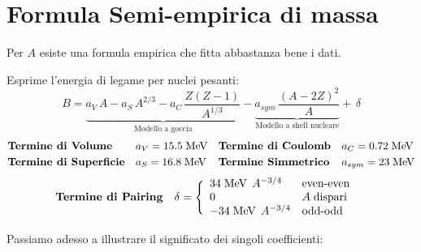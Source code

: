 \section{Formula Semi-empirica di massa}
Per $A$  esiste una formula empirica che fitta abbastanza bene i dati.
\begin{definition}
Esprime l'energia di legame per nuclei pesanti:
$$B = \underbrace{a_V \, A - a_S\, A^{2/3} - a_C \, \frac{Z(Z-1)}{A^{1/3}}}_\text{Modello a goccia} %
- \underbrace{a_{sym} \, \frac{(A-2Z)^2}{A}}_\text{Modello a shell nucleare} %
+\, \delta$$
\begin{displaymath}
\begin{aligned}
&\text{\textbf{Termine di Volume}} & &a_V = 15.5\;\mbox{MeV} & &\text{\textbf{Termine di Coulomb}} & &a_C = 0.72\;\mbox{MeV}\\
&\text{\textbf{Termine di Superficie}} & &a_S = 16.8\;\mbox{MeV} & &\text{\textbf{Termine Simmetrico}} & &a_{sym} = 23\;\mbox{MeV}\\
\end{aligned}
\end{displaymath}
\begin{displaymath}
\begin{aligned}
&\text{\textbf{Termine di Pairing}} & &\delta = \Biggl \{ 
\begin{array}{ll}
    34\;\mbox{MeV}\;\, A^{-3/4} &  \text{even-even}\\
    0 &  A\; \text{dispari}\\
    -34\;\mbox{MeV}\;\, A^{-3/4} & \text{odd-odd}
\end{array}
\end{aligned}
\end{displaymath}
\end{definition}
Passiamo adesso a illustrare il significato dei singoli coefficienti:
